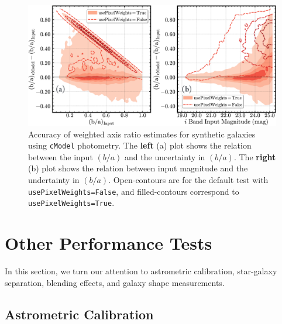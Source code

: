\documentclass[useamsfonts]{pasj01}
\def\cmodel{\texttt{cModel}}
\begin{document}
\begin{figure}
    \begin{center}
        \includegraphics[width=\textwidth]{fig/synpipe_galaxy_ba}
    \end{center}
    \caption{
        Accuracy of weighted axis ratio estimates for synthetic
        galaxies using \cmodel{} photometry.
        The \textbf{left} (a) plot shows the relation between the input $(b/a)$ and 
        the uncertainty in $(b/a)$.
        The \textbf{right} (b) plot shows the relation between input magnitude and 
        the undertainty in $(b/a)$.
        Open-contours are for the default test with \texttt{usePixelWeights=False}, and 
        filled-contours correspond to \texttt{usePixelWeights=True}.
        }
    \label{fig:galaxy_ba}
\end{figure}



\section{Other Performance Tests}
    \label{sec:others}

    In this section, we turn our attention to astrometric calibration, star-galaxy 
    separation, blending effects, and galaxy shape measurements. 

\subsection{Astrometric Calibration}
    \label{ssec:astrometry}
\end{document}
